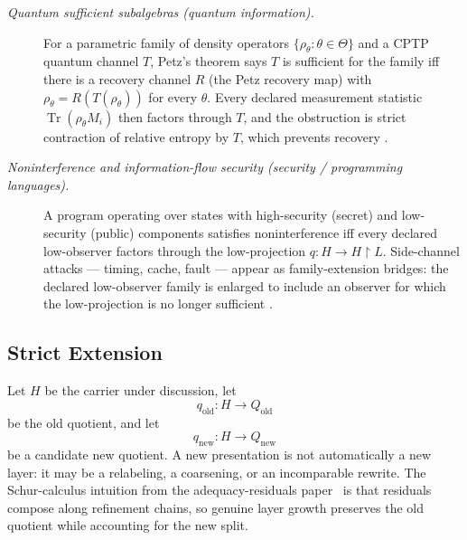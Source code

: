 \documentclass[11pt]{article}
\newcommand{\currQ}{Q}                 \newcommand{\predM}{M}                 \newcommand{\splitObs}{\Delta}         \newcommand{\quotMap}{\pi}             \newcommand{\accessQ}{q_I}             \newcommand{\obsSig}{\sigma_I}         \newcommand{\closureForm}{\mathsf{cl}} \newcommand{\BirdInt}{\mathsf{BirdInt}}
\newcommand{\PaperAR}{the adequacy-residuals paper}
\theoremstyle{definition}
\begin{document}
\begin{description}
\item[\emph{Quantum sufficient subalgebras (quantum information).}]
For a parametric family of density operators
\(\{\rho_\theta:\theta\in\Theta\}\) and a CPTP quantum channel \(T\),
Petz's theorem says \(T\) is sufficient for the family iff there is a
recovery channel \(R\) (the Petz recovery map) with
\(\rho_\theta=R(T(\rho_\theta))\) for every \(\theta\).  Every declared
measurement statistic \(\operatorname{Tr}(\rho_\theta M_i)\) then
factors through \(T\), and the obstruction is strict contraction of
relative entropy by \(T\), which prevents recovery
\citep{Petz1986SufficientSubalgebras}.

\item[\emph{Noninterference and information-flow security (security /
programming languages).}]
A program operating over states with high-security (secret) and
low-security (public) components satisfies noninterference iff every
declared low-observer factors through the low-projection
\(q:H\to H{\restriction}L\).  Side-channel attacks --- timing, cache,
fault --- appear as family-extension bridges: the declared
low-observer family is enlarged to include an observer for which the
low-projection is no longer sufficient
\citep{GoguenMeseguer1982SecurityPolicies,SabelfeldMyers2003LanguageBasedInformationFlow}.
\end{description}

\subsection{Strict Extension}\label{sec:stability:strict-extension}

Let \(H\) be the carrier under discussion, let
\[
  q_{\mathrm{old}}:H\to \currQ_{\mathrm{old}}
\]
be the old quotient, and let
\[
  q_{\mathrm{new}}:H\to \currQ_{\mathrm{new}}
\]
be a candidate new quotient.  A new presentation is not
automatically a new layer: it may be a relabeling, a coarsening, or
an incomparable rewrite.  The Schur-calculus intuition from
\PaperAR\ \citep{Tsiokos2026XiCompanion} is that residuals compose
along refinement chains, so genuine layer growth preserves the old
quotient while accounting for the new split.
\end{document}
